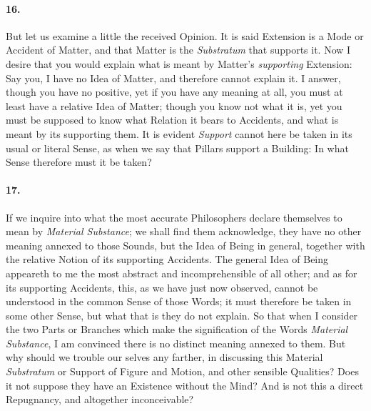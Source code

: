 \documentclass[]{article}
\newenvironment{sectionbody}{}{}
\begin{document}
\begin{sectionbody}
\paragraph{16.} But let us examine a little the received Opinion.  It is said
Extension is a Mode or Accident of Matter, and that Matter is the
\emph{Substratum} that supports it.  Now I desire that you
would explain what is meant by Matter's \emph{supporting}
Extension: Say you, I have no Idea of Matter, and therefore
cannot explain it.  I answer, though you have no positive, yet if
you have any meaning at all, you must at least have a relative
Idea of Matter; though you know not what it is, yet you must be
supposed to know what Relation it bears to Accidents, and what is
meant by its supporting them.  It is evident \emph{Support}
cannot here be taken in its usual or literal Sense, as when we
say that Pillars support a Building: In what Sense therefore must
it be taken?



\paragraph{17.} If we inquire into what the most accurate Philosophers declare
themselves to mean by \emph{Material Substance}; we shall find
them acknowledge, they have no other meaning annexed to those
Sounds, but the Idea of Being in general, together with the
relative Notion of its supporting Accidents.  The general Idea of
Being appeareth to me the most abstract and incomprehensible of
all other; and as for its supporting Accidents, this, as we have
just now observed, cannot be understood in the common Sense of
those Words; it must therefore be taken in some other Sense, but
what that is they do not explain.  So that when I consider the
two Parts or Branches which make the signification of the Words
\emph{Material Substance}, I am convinced there is no distinct
meaning annexed to them.  But why should we trouble our selves
any farther, in discussing this Material \emph{Substratum} or
Support of Figure and Motion, and other sensible Qualities? Does
it not suppose they have an Existence without the Mind? And is
not this a direct Repugnancy, and altogether inconceivable?




\end{sectionbody}
\end{document}
